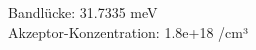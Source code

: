 
Bandlücke: 31.7335 meV\\
Akzeptor-Konzentration: 1.8e+18 /cm³\\

\begin{figure}[p]
\centering

\end{figure}

\begin{figure}[p]
\centering

\end{figure}

\newpage
\begin{addmargin}[-3em]{3em}

\end{addmargin}

